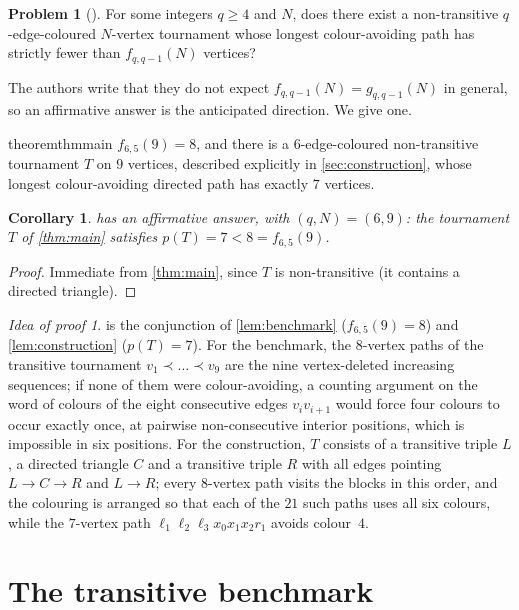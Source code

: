 \documentclass[11pt,a4paper]{article}
\theoremstyle{plain}
\newtheorem{corollary}[theorem]{Corollary}
\theoremstyle{definition}
\newtheorem{problem}[theorem]{Problem}
\theoremstyle{remark}
\newtheorem*{proofidea}{Idea of proof}
\newcommand{\pth}{p}
\newcommand{\lv}{\ell}
\begin{document}
\begin{problem}[{\cite[Problem~5.1]{FSW25}}]\label{prob:51}
For some integers $q\ge4$ and $N$, does there exist a non-transitive $q$-edge-coloured $N$-vertex tournament whose longest colour-avoiding path has strictly fewer than $f_{q,q-1}(N)$ vertices?
\end{problem}

The authors write that they do not expect $f_{q,q-1}(N)=g_{q,q-1}(N)$ in general, so an affirmative answer is the anticipated direction. We give one.

\begin{restatable}{theorem}{thmmain}\label{thm:main}
$f_{6,5}(9)=8$, and there is a $6$-edge-coloured non-transitive tournament $T$ on $9$ vertices, described explicitly in \cref{sec:construction}, whose longest colour-avoiding directed path has exactly $7$ vertices.
\end{restatable}

\begin{corollary}\label{cor:51}
 has an affirmative answer, with $(q,N)=(6,9)$: the tournament $T$ of \cref{thm:main} satisfies $\pth(T)=7<8=f_{6,5}(9)$.
\end{corollary}
\begin{proof}
Immediate from \cref{thm:main}, since $T$ is non-transitive (it contains a directed triangle).
\end{proof}

\begin{proofidea}
 is the conjunction of \cref{lem:benchmark} ($f_{6,5}(9)=8$) and \cref{lem:construction} ($\pth(T)=7$). For the benchmark, the $8$-vertex paths of the transitive tournament $v_1\prec\dots\prec v_9$ are the nine vertex-deleted increasing sequences; if none of them were colour-avoiding, a counting argument on the word of colours of the eight consecutive edges $v_iv_{i+1}$ would force four colours to occur exactly once, at pairwise non-consecutive interior positions, which is impossible in six positions. For the construction, $T$ consists of a transitive triple $L$, a directed triangle $C$ and a transitive triple $R$ with all edges pointing $L\to C\to R$ and $L\to R$; every $8$-vertex path visits the blocks in this order, and the colouring is arranged so that each of the $21$ such paths uses all six colours, while the $7$-vertex path $\lv_1\lv_2\lv_3x_0x_1x_2r_1$ avoids colour~$4$.
\end{proofidea}

\section{The transitive benchmark}\label{sec:benchmark}
\end{document}
